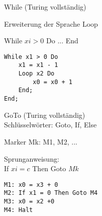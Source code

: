 \begin{minipage}{0.5\linewidth}
    \begin{KR}{While (Turing vollständig)}

        Erweiterung der Sprache Loop

        While $xi > 0$ Do ... End
    \end{KR}
    \begin{example}        
\begin{lstlisting}[style=Pseudocode, aboveskip=-0.5\baselineskip, belowskip=-0.5\baselineskip]
While x1 > 0 Do
    x1 = x1 - 1
    Loop x2 Do
        x0 = x0 + 1
    End;
End;
\end{lstlisting}
\end{example}
\end{minipage}
\begin{minipage}{0.5\linewidth}
\begin{KR}{GoTo (Turing vollständig)}\\
        Schlüsselwörter: Goto, If, Else
        
        Marker Mk: M1, M2, ...
        
        Sprunganweisung:\\ If $xi = c$ Then Goto $Mk$ 
\end{KR}
\begin{example}
\begin{lstlisting}[style=Pseudocode, aboveskip=-0.5\baselineskip, belowskip=-0.5\baselineskip]
M1: x0 = x3 + 0
M2: If x1 = 0 Then Goto M4
M3: x0 = x2 +0
M4: Halt
\end{lstlisting}
\end{example}
\end{minipage}
